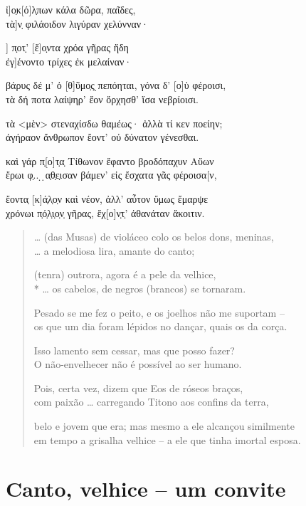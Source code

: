 \begin{gkverse}
ἰ]ο̣κ[ό]λ̣πων κάλα δῶρα, παῖδες,\\
        τὰ]ν̣ φιλάοιδον λιγύραν χελύνναν·

] π̣οτ̣’ [ἔ]ο̣ντα χρόα γῆρας ἤδη\\
         ἐγ]ένοντο τρίχες ἐκ μελαίναν·

βάρυς δέ μ’ ὀ [θ]ῦμο̣ς ̣πεπόηται, γόνα δ’ [ο]ὐ φέροισι,\\
τὰ δή ποτα λαίψηρ’ ἔον ὄρχησθ’ ἴσα νεβρίοισι.

τὰ <μὲν> στεναχίσδω θαμέως· ἀλλὰ τί κεν ποείην;\\
ἀγήραον ἄνθρωπον ἔοντ’ οὐ δύνατον γένεσθαι.

καὶ γάρ π̣[ο]τ̣α̣ Τίθωνον ἔφαντο βροδόπαχυν Αὔων\\
ἔρωι φ̣.. ̣ ̣α̣θ̣ε̣ισαν βάμεν’ εἰς ἔσχατα γᾶς φέροισα[ν,

ἔοντα̣ [κ]ά̣λ̣ο̣ν καὶ νέον, ἀλλ’ αὖτον ὔμως ἔμαρψε\\
χρόνωι π̣ό̣λ̣ι̣ο̣ν̣ γῆρας, ἔχ[ο]ν̣τ̣’ ἀθανάταν ἄκοιτιν.
\end{gkverse}

\begin{verse}
\ldots{} (das Musas) de violáceo colo os belos dons, meninas,\\
\ldots{} a melodiosa lira, amante do canto;

(tenra) outrora, agora é a pele da velhice,\\*
\ldots{} os cabelos, de negros (brancos) se tornaram.


Pesado se me fez o peito, e os joelhos não me suportam -- \\
os que um dia foram lépidos no dançar, quais os da corça.

Isso lamento sem cessar, mas que posso fazer?\\
O não-envelhecer não é possível ao ser humano.

Pois, certa vez, dizem que Eos de róseos braços,\\
com paixão \ldots{} carregando Titono aos confins da terra,

belo e jovem que era; mas mesmo a ele alcançou similmente\\
em tempo a grisalha velhice -- a ele que tinha imortal esposa.
\end{verse}

\chapter{Canto, velhice -- um convite}


